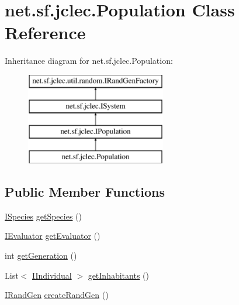 \hypertarget{classnet_1_1sf_1_1jclec_1_1_population}{\section{net.\-sf.\-jclec.\-Population Class Reference}
\label{classnet_1_1sf_1_1jclec_1_1_population}
}
Inheritance diagram for net.\-sf.\-jclec.\-Population\-:\begin{figure}[H]
\begin{center}
\leavevmode
\includegraphics[height=4.000000cm]{classnet_1_1sf_1_1jclec_1_1_population}
\end{center}
\end{figure}
\subsection*{Public Member Functions}
\begin{DoxyCompactItemize}
\item 
\hyperlink{interfacenet_1_1sf_1_1jclec_1_1_i_species}{I\-Species} \hyperlink{classnet_1_1sf_1_1jclec_1_1_population_a264eeb7f5b84566b0936fa5603cc1cd7}{get\-Species} ()
\item 
\hyperlink{interfacenet_1_1sf_1_1jclec_1_1_i_evaluator}{I\-Evaluator} \hyperlink{classnet_1_1sf_1_1jclec_1_1_population_a4604a5f5150f3907fc5119260f1cfcec}{get\-Evaluator} ()
\item 
int \hyperlink{classnet_1_1sf_1_1jclec_1_1_population_a387250a2ae861d921b730eeb863fb82e}{get\-Generation} ()
\item 
List$<$ \hyperlink{interfacenet_1_1sf_1_1jclec_1_1_i_individual}{I\-Individual} $>$ \hyperlink{classnet_1_1sf_1_1jclec_1_1_population_a0a8b5dae0fdead702efa0df8d4d3186e}{get\-Inhabitants} ()
\item 
\hyperlink{interfacenet_1_1sf_1_1jclec_1_1util_1_1random_1_1_i_rand_gen}{I\-Rand\-Gen} \hyperlink{classnet_1_1sf_1_1jclec_1_1_population_a8427e4459d5f7554337a654b363d9714}{create\-Rand\-Gen} ()
\end{DoxyCompactItemize}
